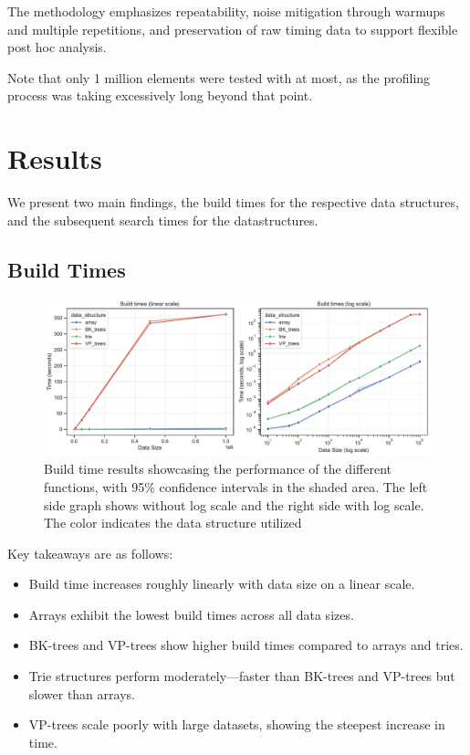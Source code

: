 \documentclass[acmsmall,screen, nonacm]{acmart}
\begin{document}
The methodology emphasizes repeatability, noise mitigation through warmups and multiple repetitions, and preservation of raw timing data to support flexible post hoc analysis.

Note that only 1 million elements were tested with at most, as the profiling process was taking excessively long beyond that point.

\section{Results}

We present two main findings, the build times for the respective data structures, and the subsequent search times for the datastructures.

\subsection{Build Times}

\begin{figure}[H]
	\centering
	\includegraphics[width=1\textwidth]{build_times.pdf}
	\caption{Build time results showcasing the performance of the different functions, with 95\% confidence intervals in the shaded area. The left side graph shows without log scale and the right side with log scale. The color indicates the data structure utilized}
	\label{fig:pdfimage1}
\end{figure}

Key takeaways are as follows:
\begin{itemize}
	\item Build time increases roughly linearly with data size on a linear scale.
	\item Arrays exhibit the lowest build times across all data sizes.
	\item BK-trees and VP-trees show higher build times compared to arrays and tries.
	\item Trie structures perform moderately—faster than BK-trees and VP-trees but slower than arrays.
	\item VP-trees scale poorly with large datasets, showing the steepest increase in time.
\end{itemize}
\end{document}
